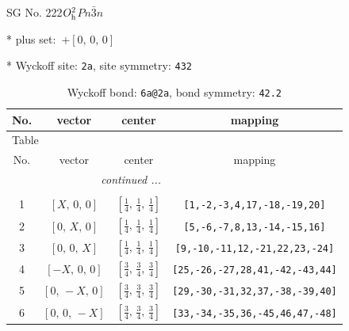 \documentclass[fleqn,8pt]{jsarticle}
\begin{document}
\setcounter{MaxMatrixCols}{32}

\renewcommand{\tablename}{Table~}
\renewcommand{\figurename}{Figure~}
\begin{center}
\LARGE
SG No. 222\quad$O_{\rm h}^{2}$\quad$Pn\bar{3}n$\quad[ cubic ]
\end{center}

* plus set:\,\,\,$+\left[ 0,\, 0,\, 0 \right]$


* Wyckoff site: {\tt 2a}, site symmetry: {\tt 432}
\renewcommand{\arraystretch}{1.2}
\begin{longtable}{cccc}
\caption{Wyckoff bond: {\tt 6a@2a}, bond symmetry: {\tt 42.2}}
 \\
 \hline \hline
No. & vector & center & mapping \\ \hline \endfirsthead

\multicolumn{3}{l}{\tablename\ \thetable{}} \\
 \hline \hline
No. & vector & center & mapping \\ \hline \endhead

 \hline \hline
\multicolumn{3}{r}{\footnotesize\it continued ...} \\ \endfoot

 \hline \hline
\multicolumn{3}{r}{} \\ \endlastfoot

1 & $\left[ X,\, 0,\, 0 \right]$ & $\left[ \frac{1}{4},\, \frac{1}{4},\, \frac{1}{4} \right]$ & {\tt [1,-2,-3,4,17,-18,-19,20]} \\ \hline
2 & $\left[ 0,\, X,\, 0 \right]$ & $\left[ \frac{1}{4},\, \frac{1}{4},\, \frac{1}{4} \right]$ & {\tt [5,-6,-7,8,13,-14,-15,16]} \\ \hline
3 & $\left[ 0,\, 0,\, X \right]$ & $\left[ \frac{1}{4},\, \frac{1}{4},\, \frac{1}{4} \right]$ & {\tt [9,-10,-11,12,-21,22,23,-24]} \\ \hline
4 & $\left[ - X,\, 0,\, 0 \right]$ & $\left[ \frac{3}{4},\, \frac{3}{4},\, \frac{3}{4} \right]$ & {\tt [25,-26,-27,28,41,-42,-43,44]} \\ \hline
5 & $\left[ 0,\, - X,\, 0 \right]$ & $\left[ \frac{3}{4},\, \frac{3}{4},\, \frac{3}{4} \right]$ & {\tt [29,-30,-31,32,37,-38,-39,40]} \\ \hline
6 & $\left[ 0,\, 0,\, - X \right]$ & $\left[ \frac{3}{4},\, \frac{3}{4},\, \frac{3}{4} \right]$ & {\tt [33,-34,-35,36,-45,46,47,-48]} \\
\end{longtable}
\renewcommand{\arraystretch}{1.2}
\end{document}
